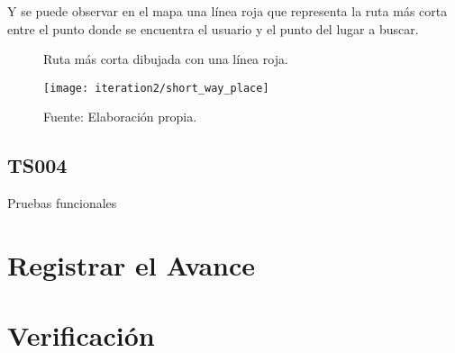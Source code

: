 %

Y se puede observar en el mapa una línea roja que representa la ruta más corta entre el punto donde se encuentra el usuario y el punto del lugar a buscar.

\begin{figure}[H]
  \begin{center}
    \caption{Ruta más corta dibujada con una línea roja.}
    \label{fig:short_way_place}
    \texttt{[image: iteration2/short\_way\_place]}
    \caption*{Fuente: Elaboración propia.}
  \end{center}
\end{figure}

\subsection{TS004}
\label{sub:TS004}

Pruebas funcionales

\section{Registrar el Avance}
\label{sec:iteracion2_avance}

\section{Verificación}
\label{sec:iteracion2_verificacion}
